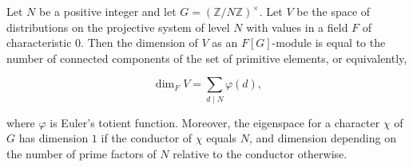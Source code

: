 Let $N$ be a positive integer and let $G = (\mathbb{Z}/N\mathbb{Z})^\times$. Let
$V$ be the space of distributions on the projective system of level $N$ with values
in a field $F$ of characteristic $0$. Then the dimension of $V$ as an $F[G]$-module
is equal to the number of connected components of the set of primitive elements, or
equivalently,

$$\dim_F V = \sum_{d \mid N} \varphi(d),$$

where $\varphi$ is Euler's totient function. Moreover, the eigenspace for a character
$\chi$ of $G$ has dimension $1$ if the conductor of $\chi$ equals $N$, and dimension
depending on the number of prime factors of $N$ relative to the conductor otherwise.
